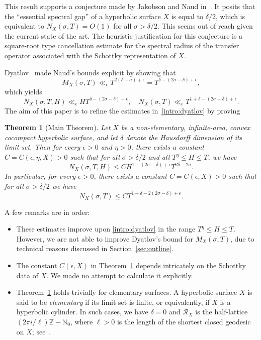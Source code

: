 \documentclass[12pt,letterpaper]{amsart}
\theoremstyle{plain}
\newtheorem{theorem}[prop]{Theorem}
\theoremstyle{definition}
\theoremstyle{remark}
\begin{document}
This result supports a conjecture made by Jakobson and Naud in~\cite{JN}. It posits that the ``essential spectral gap'' of a hyperbolic surface \(X\) is equal to \(\delta/2\), which is equivalent to \(N_X(\sigma,T) = O(1)\) for all \(\sigma > \delta/2\). This seems out of reach given the current state of the art. The heuristic justification for this conjecture is a square-root type cancellation estimate for the spectral radius of the transfer operator associated with the Schottky representation of \(X\).

Dyatlov~\cite{Dya19} made Naud’s bounds explicit by showing that
\begin{equation}\label{intro:dyatlov_m}
M_X(\sigma,T) \ll_\epsilon T^{2(\delta - \sigma) + \epsilon} = T^{\delta - (2\sigma - \delta) + \epsilon},
\end{equation}
which yields
\begin{equation}\label{intro:dyatlov}
N_X(\sigma,T,H) \ll_\epsilon H T^{\delta - (2\sigma - \delta) + \epsilon}, \quad 
N_X(\sigma,T) \ll_\epsilon T^{1 + \delta - (2\sigma - \delta) + \epsilon}.
\end{equation}
The aim of this paper is to refine the estimates in~\eqref{intro:dyatlov} by proving

\begin{theorem}[Main Theorem]\label{main_thm}
Let $X$ be a non-elementary, infinite-area, convex cocompact hyperbolic surface, and let $\delta$ denote the Hausdorff dimension of its limit set. Then for every $\epsilon > 0$ and $\eta > 0$, there exists a constant $C = C(\epsilon, \eta, X) > 0$ such that for all $\sigma > \delta/2$ and all $T^\eta \le H \le T$, we have
\[
N_X(\sigma, T, H) \le C  H^{1-(2\sigma-\delta)+\epsilon} T^{2\delta - 2\sigma}.
\]
In particular, for every $\epsilon > 0$, there exists a constant $C = C(\epsilon, X) > 0$ such that for all $\sigma > \delta/2$ we have
\[
N_X(\sigma, T) \le C  T^{1 + \delta - 2(2\sigma - \delta) + \epsilon}.
\]
\end{theorem}

A few remarks are in order:

\begin{itemize}
\item These estimates improve upon \eqref{intro:dyatlov} in the range $T^{\eta} \le H \le T$. However, we are not able to improve Dyatlov's bound for $M_X(\sigma,T)$, due to technical reasons discussed in Section~\ref{sec:outline}.

\item The constant $C(\epsilon, X)$ in Theorem~\ref{main_thm} depends intricately on the Schottky data of $X$. We made no attempt to calculate it explicitly.

\item Theorem~\ref{main_thm} holds trivially for elementary surfaces. A hyperbolic surface $X$ is said to be \textit{elementary} if its limit set is finite, or equivalently, if $X$ is a hyperbolic cylinder. In such cases, we have $\delta = 0$ and $\mathcal{R}_X$ is the half-lattice $(2\pi i/\ell)\mathbb{Z} - \mathbb{N}_0$, where $\ell > 0$ is the length of the shortest closed geodesic on $X$; see~\cite[Proposition~5.1]{Borthwick_book}.
\end{itemize}
\end{document}
